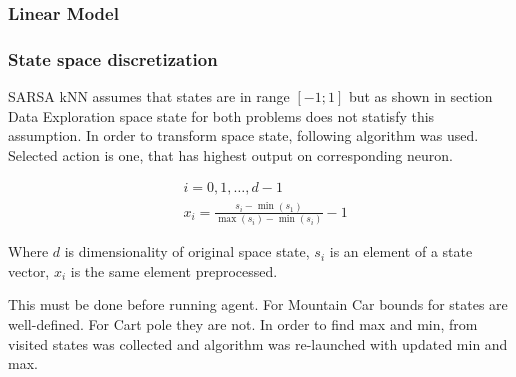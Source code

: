 \documentclass[12pt]{article}
\begin{document}
\subsubsection{Linear Model}
\subsubsection{State space discretization}

SARSA kNN assumes that states are in range $[-1;1]$ but as shown in section Data Exploration space state for both problems does not statisfy this assumption. In order to transform space state, following algorithm was used. Selected action is one, that has highest output on corresponding neuron. 

\begin{equation}
\begin{aligned}
&i={0,1,\ldots, d-1} \\
&x_i = \frac{s_i - \min(s_1)}{\max(s_i) - \min(s_i)} - 1
\end{aligned}
\end{equation}

Where $d$ is dimensionality of original space state, $s_i$ is an element of a state vector, $x_i$ is the same element preprocessed.

This must be done before running agent. For Mountain Car bounds for states are well-defined. For Cart pole they are not. In order to find max and min, from visited states was collected and algorithm was re-launched with updated min and max.
\end{document}
